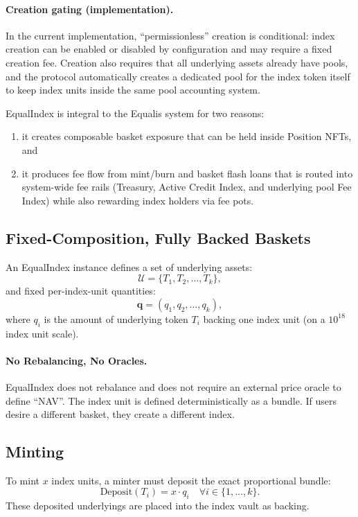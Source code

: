 \documentclass[version=preprint]{iacrcc}
\begin{document}
\paragraph{Creation gating (implementation).}
In the current implementation, ``permissionless'' creation is conditional: index creation can be enabled or disabled by configuration and may require a fixed creation fee. Creation also requires that all underlying assets already have pools, and the protocol automatically creates a dedicated pool for the index token itself to keep index units inside the same pool accounting system.

EqualIndex is integral to the Equalis system for two reasons:
\begin{enumerate}
  \item it creates composable basket exposure that can be held inside Position NFTs, and
  \item it produces fee flow from mint/burn and basket flash loans that is routed into system-wide fee rails (Treasury, Active Credit Index, and underlying pool Fee Index) while also rewarding index holders via fee pots.
\end{enumerate}

\subsection{Fixed-Composition, Fully Backed Baskets}

An EqualIndex instance defines a set of underlying assets:
\[
\mathcal{U} = \{T_1, T_2, \ldots, T_k\},
\]
and fixed per-index-unit quantities:
\[
\mathbf{q} = (q_1, q_2, \ldots, q_k),
\]
where $q_i$ is the amount of underlying token $T_i$ backing one index unit (on a $10^{18}$ index unit scale).

\paragraph{No Rebalancing, No Oracles.}
EqualIndex does not rebalance and does not require an external price oracle to define ``NAV''. The index unit is defined deterministically as a bundle. If users desire a different basket, they create a different index.

\subsection{Minting}

To mint $x$ index units, a minter must deposit the exact proportional bundle:
\[
\text{Deposit}(T_i) = x \cdot q_i \quad \forall i \in \{1,\ldots,k\}.
\]
These deposited underlyings are placed into the index vault as backing.
\end{document}
